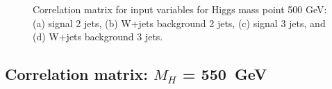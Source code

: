 \begin{figure}[bthp!]
\caption{\label{fig:FigCorr500Mu} 
Correlation matrix for input variables for Higgs mass point 500 GeV:
(a) signal 2 jets, (b) W+jets background 2 jets, 
(c) signal 3 jets, and (d) W+jets background 3 jets.
}
\end{figure}
\newpage
\subsection{Correlation matrix: \texorpdfstring{$M_H$}{M(H)} = 550~GeV}
\begin{figure}[bthp!]
\vspace*{1mm} \\
\end{figure}
